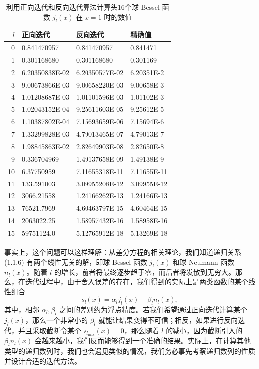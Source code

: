 \begin{table}[htbp]
\centering
\caption{利用正向迭代和反向迭代算法计算头16个球 Bessel 函数 $j_l(x)$ 在 $x=1$ 时的数值}
\label{tab:bessel-iterations}
\small
\begin{tabular}{rlll}
\toprule
$l$ & 正向迭代 & 反向迭代 & 精确值\\
\midrule
0  & 0.841470957 & 0.841470957 & 0.841471\\
1  & 0.301168680 & 0.301168680 & 0.301169\\
2  & 6.20350838E-02 & 6.20350577E-02 & 6.20351E-2\\
3  & 9.00673866E-03 & 9.00658220E-03 & 9.00658E-3\\
4  & 1.01208687E-03 & 1.01101596E-03 & 1.01102E-3\\
5  & 1.02043152E-04 & 9.25611603E-05 & 9.25612E-5\\
6  & 1.10387802E-04 & 7.15693659E-06 & 7.15694E-6\\
7  & 1.33299828E-03 & 4.79013465E-07 & 4.79013E-7\\
8  & 1.98845863E-02 & 2.82649903E-08 & 2.82650E-8\\
9  & 0.336704969 & 1.49137658E-09 & 1.49138E-9\\
10 & 6.37750959 & 7.11655318E-11 & 7.11655E-11\\
11 & 133.591003 & 3.09955208E-12 & 3.09955E-12\\
12 & 3066.21558 & 1.24166262E-13 & 1.24166E-13\\
13 & 76521.7969 & 4.60463797E-15 & 4.60464E-15\\
14 & 2063022.25 & 1.58957432E-16 & 1.58958E-16\\
15 & 59751124.0 & 5.12765912E-18 & 5.13269E-18\\
\bottomrule
\end{tabular}
\end{table}

事实上，这个问题可以这样理解：从差分方程的相关理论，我们知道递归关系 (1.1.6) 有两个线性无关的解，即球 Bessel 函数 $j_l(x)$ 和球 Neumann 函数 $n_l(x)$。随着 $l$ 的增长，前者将最终逐步趋于零，而后者将发散到无穷大。那么，在迭代过程中，由于舍入误差的存在，我们得到的实际上是两类函数的某个线性组合
\begin{equation}
s_l(x)=\alpha_l j_l(x)+\beta_l n_l(x),
\tag{1.1.8}
\end{equation}
其中，相邻 $\alpha_l,\beta_l$ 之间的差别约为浮点精度。若我们希望通过正向迭代计算某个 $j_l(x)$，那么一个非常小的 $\beta_l$ 就能让结果变得不可信；相反，如果进行反向迭代，并且采取截断令某个 $s_{l_{\max}}(x)=0$，那么随着 $l$ 的减小，因为截断引入的 $\beta_l n_l(x)$ 会越来越小，我们反而能够得到一个准确的结果。实际上，在计算其他类型的递归数列时，我们也会遇见类似的情况，我们务必事先考察递归数列的性质并设计合适的迭代方法。

